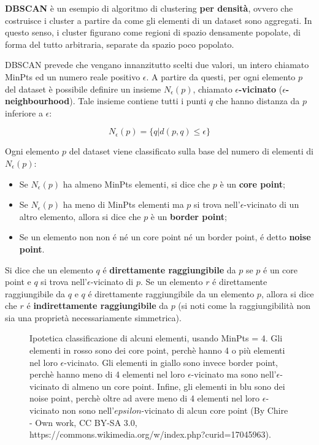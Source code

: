 \documentclass[12pt]{report}
\begin{document}
				\textbf{DBSCAN} è un esempio di algoritmo di clustering \textbf{per
				densità}, ovvero che costruisce i cluster a partire da come gli
				elementi di un dataset sono aggregati. In questo senso, i cluster
				figurano come regioni di spazio densamente popolate, di forma del
				tutto arbitraria, separate da spazio poco popolato.

				DBSCAN prevede che vengano innanzitutto scelti due valori, un intero
				chiamato MinPts ed un numero reale positivo $\epsilon$. A partire da
				questi, per ogni elemento $p$ del dataset è possibile definire un
				insieme $N_{\epsilon}(p)$, chiamato $\epsilon$\textbf{-vicinato}
				($\epsilon$\textbf{-neighbourhood}). Tale insieme contiene tutti i
				punti $q$ che hanno distanza da $p$ inferiore a $\epsilon$:

				\begin{equation*}
					N_{\epsilon} (p) = \{q | d(p, q) \leq \epsilon\}
				\end{equation*}

				Ogni elemento $p$ del dataset viene classificato sulla base del numero
				di elementi di $N_{\epsilon}(p)$:

				\begin{itemize}
					\item
					Se $N_{\epsilon}(p)$ ha almeno MinPts elementi, si dice che $p$ è un
					\textbf{core point};
					\item
					Se $N_{\epsilon}(p)$ ha meno di MinPts elementi ma $p$ si trova
					nell'$\epsilon$-vicinato di un altro elemento, allora si dice che
					$p$ è un \textbf{border point};
					\item
					Se un elemento non non é né un core point né un border
					point, é detto \textbf{noise point}.
				\end{itemize}

				Si dice che un elemento $q$ é \textbf{direttamente raggiungibile}
				da $p$ se $p$ é un core point e $q$ si trova nell'$\epsilon$-vicinato
				di $p$. Se un elemento $r$ é direttamente raggiungibile da $q$ e $q$
				é direttamente raggiungibile da un elemento $p$, allora si dice che
				$r$ é \textbf{indirettamente raggiungibile} da $p$ (si noti come
				la raggiungibilità non sia una proprietà necessariamente simmetrica).

				\begin{figure}[H]
					\centering
					
					\caption{Ipotetica classificazione di alcuni elementi, usando
					MinPts = 4. Gli elementi in rosso sono dei core point, perchè
					hanno 4 o più elementi nel loro $\epsilon$-vicinato. Gli elementi
					in giallo sono invece border point, perchè hanno meno di 4 elementi
					nel loro $\epsilon$-vicinato ma sono nell'$\epsilon$-vicinato di
					almeno un core point. Infine, gli elementi in blu sono dei
					noise point, perchè oltre ad avere meno di 4 elementi nel loro
					$\epsilon$-vicinato non sono nell'$epsilon$-vicinato di alcun
					core point (By Chire - Own work, CC BY-SA 3.0,
					https://commons.wikimedia.org/w/index.php?curid=17045963).}
					\label{fig:dbscan-illustration}
				\end{figure}
\end{document}
